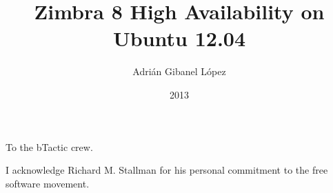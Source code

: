 

\clearpage{}  %



\title{Zimbra 8 High Availability on Ubuntu 12.04}
\author{Adri\'an Gibanel L\'opez}
\date{2013}
\thesis

\maketitle

\copyrightpage

\begin{dedication}
To the bTactic crew.
\end{dedication}

\begin{acknowledgments}
I acknowledge Richard M. Stallman for his personal commitment to the free software movement.
\end{acknowledgments}

